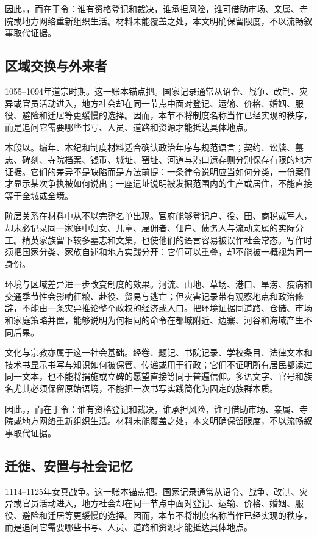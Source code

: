 因此，，而在于令：谁有资格登记和裁决，谁承担风险，谁可借助市场、亲属、寺院或地方网络重新组织生活。材料未能覆盖之处，本文明确保留限度，不以流畅叙事取代证据。

\subsection{区域交换与外来者}

1055--1094年道宗时期。这一账本锚点把。国家记录通常从诏令、战争、改制、灾异或官员活动进入，地方社会却在同一节点中面对登记、运输、价格、婚姻、服役、避险和迁居等更缓慢的选择。因而，本节不将制度名称当作已经实现的秩序，而是追问它需要哪些书写、人员、道路和资源才能抵达具体地点。

本段以。编年、本纪和制度材料适合确认政治年序与规范语言；契约、讼牍、墓志、碑刻、寺院档案、钱币、城址、窑址、河道与港口遗存则分别保存有限的地方证据。它们的差异不是缺陷而是方法前提：一条律令说明应当如何分类，一份案件才显示某次争执被如何说出；一座遗址说明被发掘范围内的生产或居住，不能直接等于全城或全境。

阶层关系在材料中从不以完整名单出现。官府能够登记户、役、田、商税或军人，却未必记录同一家庭中妇女、儿童、雇佣者、佃户、债务人与流动亲属的实际分工。精英家族留下较多墓志和文集，也使他们的语言容易被误作社会常态。写作时须把国家分类、家族自述和地方实践分开：它们可以重叠，却不能被一概视为同一身份。

环境与区域差异进一步改变制度的效果。河流、山地、草场、港口、旱涝、疫病和交通季节性会影响征粮、赴役、贸易与逃亡；但灾害记录带有观察地点和政治修辞，不能由一条灾异推论整个政权的经济或人口。把环境证据同道路、仓储、市场和家庭策略并置，能够说明为何相同的命令在都城附近、边寨、河谷和海域产生不同后果。

文化与宗教亦属于这一社会基础。经卷、题记、书院记录、学校条目、法律文本和技术书显示书写与知识如何被保管、传递或用于行政；它们不证明所有居民都读过同一文本，也不能将捐施或立碑的愿望直接等同于普遍信仰。多语文字、官号和族名尤其必须保留原始语境，不能把一次书写实践简化为固定的族群本质。

因此，，而在于令：谁有资格登记和裁决，谁承担风险，谁可借助市场、亲属、寺院或地方网络重新组织生活。材料未能覆盖之处，本文明确保留限度，不以流畅叙事取代证据。

\subsection{迁徙、安置与社会记忆}

1114--1125年女真战争。这一账本锚点把。国家记录通常从诏令、战争、改制、灾异或官员活动进入，地方社会却在同一节点中面对登记、运输、价格、婚姻、服役、避险和迁居等更缓慢的选择。因而，本节不将制度名称当作已经实现的秩序，而是追问它需要哪些书写、人员、道路和资源才能抵达具体地点。

